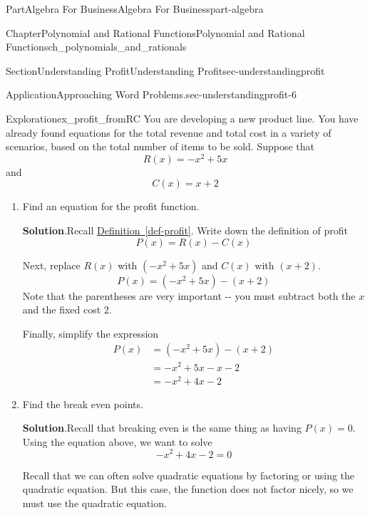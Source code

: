 \documentclass{tufte-book}
\newcommand{\blocktitlefont}{\relax}
\newcommand{\xreffont}{\relax}
\numberwithin{equation}{chapter}
\newcommand{\amp}{&}
\begin{document}
\begin{partptx}{Part}{Algebra For Business}{}{Algebra For Business}{}{}{part-algebra}
\begin{chapterptx}{Chapter}{Polynomial and Rational Functions}{}{Polynomial and Rational Functions}{}{}{ch_polynomials_and_rationals}
\begin{sectionptx}{Section}{Understanding Profit}{}{Understanding Profit}{}{}{sec-understandingprofit}
\begin{insight}{Application}{Approaching Word Problems.}{sec-understandingprofit-6}
\begin{itemize}[label=\textbullet]
\end{itemize}
%
\end{insight}
\begin{exploration}{Exploration}{}{ex_profit_fromRC}%
You are developing a new product line. You have already found equations for the total revenue and total cost in a variety of scenarios, based on the total number of items to be sold.  Suppose that%
\begin{equation*}
R(x) = -x^2 + 5x
\end{equation*}
and%
\begin{equation*}
C(x) = x+2
\end{equation*}
%
\begin{enumerate}[font=\bfseries,label=(\alph*),ref=\alph*]%
\item{}Find an equation for the profit function.%
\par\smallskip%
\noindent\textbf{\blocktitlefont Solution}.\hypertarget{ex_profit_fromRC-2-2}{}\quad{}Recall \hyperref[def-profit]{Definition~{\xreffont\ref{def-profit}}}.  Write down the definition of profit%
\begin{equation*}
P(x) = R(x) - C(x)
\end{equation*}
%
\par
Next, replace \(R(x)\) with \((-x^2 + 5x)\) and \(C(x)\) with \((x+2)\).%
\begin{equation*}
P(x) = (-x^2 + 5x) - (x+2)
\end{equation*}
Note that the parentheses are very important -{}-{} you must subtract both the \(x\) and the fixed cost \(2\).%
\par
Finally, simplify the expression%
\begin{align*}
P(x) \amp =  (-x^2 + 5x) - (x+2)\\
\amp = -x^2 + 5x -x -2\\
\amp = -x^2 + 4x -2
\end{align*}
%
\item{}Find the break even points.%
\par\smallskip%
\noindent\textbf{\blocktitlefont Solution}.\hypertarget{ex_profit_fromRC-3-2}{}\quad{}Recall that breaking even is the same thing as having \(P(x) = 0\).  Using the equation above, we want to solve%
\begin{equation*}
-x^2 + 4x -2 = 0
\end{equation*}
%
\par
Recall that we can often solve quadratic equations by factoring or using the quadratic equation.  But this case, the function does not factor nicely, so we must use the quadratic equation.%

\end{enumerate}
\end{exploration}
\end{sectionptx}
\end{chapterptx}
\end{partptx}
\end{document}
